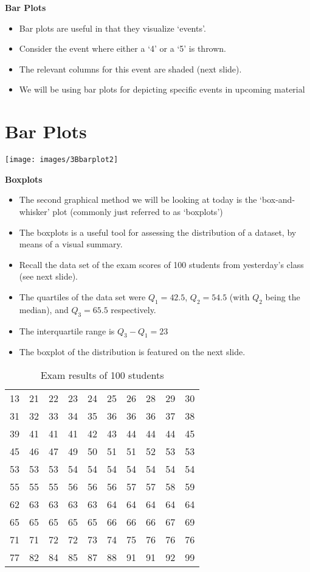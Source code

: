 \documentclass[]{report}
\begin{document}
{
\textbf{Bar Plots}

\begin{itemize}
\item  Bar plots are useful in that they visualize `events'.
\item  Consider the event where either a `4' or a `5' is thrown.
\item  The relevant columns for this event are shaded (next slide).
\item  We will be using bar plots for depicting specific events in upcoming material
\end{itemize}

\newpage
\section{Bar Plots}

\begin{center}
\texttt{[image: images/3Bbarplot2]}
\end{center}

\textbf{Boxplots}
\begin{itemize}
\item  The second graphical method we will be looking at today is the `box-and-whisker' plot (commonly just referred to as `boxplots')
\item  The boxplots is a useful tool for assessing the distribution of a dataset, by means of a visual summary.
\item  Recall the data set of the exam scores of 100 students from yesterday's class (see next slide).
\item  The quartiles of the data set were $Q_1 = 42.5$, $Q_2 = 54.5$ (with $Q_2$ being the median), and $Q_3 =  65.5$ respectively.
\item  The interquartile range is $Q_3 - Q_1 = 23$
\item  The boxplot of the distribution is featured on the next slide.
\end{itemize}
}
{
\begin{table}[ht]
\caption{Exam results of 100 students} %
\centering %
\begin{tabular}{|c ccc ccc ccc|} %
\hline

13&21&22&23&24&25&26&28&29&30\\31&32&33&34&35& 36&36&36&37&38\\
39&41&41&41&42&43&44&44&44&45\\45&46&47&49&50& 51&51&52&53&53\\
53&53&53&54&54&54&54&54&54&54\\55&55&55&56&56& 56&57&57&58&59\\
62&63&63&63&63&64&64&64&64&64\\65&65&65&65&65& 66&66&66&67&69\\
71&71&72&72&73&74&75&76&76&76\\77&82&84&85&87& 88&91&91&92&99\\ \hline
\end{tabular}
\end{table}
}
\end{document}
